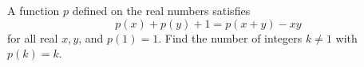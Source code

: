 A function $p$ defined on the real numbers satisfies
\[p(x)+p(y)+1=p(x+y)-xy\]
for all real $x,y$, and $p(1)=1$. Find the number of integers $k\ne1$ with $p(k)=k$.
